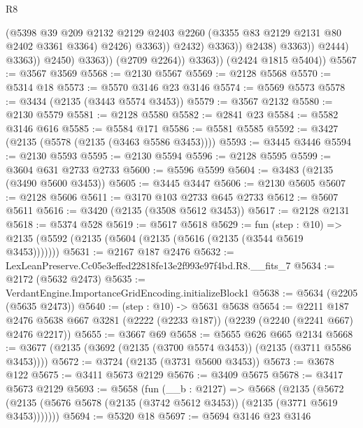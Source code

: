 \begin{lexlean}{R8}
\begin{coremodule}
                                        (@5398
                                          @39
                                          @209
                                          @2132
                                          @2129
                                          @2403
                                          @2260
                                          (@3355 @83 @2129 @2131 @80 @2402 @3361 @3364)
                                          @2426)
                                        @3363))
                                    @2432)
                                  @3363))
                              @2438)
                            @3363))
                        @2444)
                      @3363))
                  @2450)
                @3363))
            (@2709 @2264))
          @3363))
      (@2424 @1815 @5404))
@5567 := @3567 @3569
@5568 := @2130 @5567
@5569 := @2128 @5568
@5570 := @5314 @18
@5573 := @5570 @3146 @23 @3146
@5574 := @5569 @5573
@5578 := @3434 (@2135 (@3443 @5574 @3453))
@5579 := @3567 @2132
@5580 := @2130 @5579
@5581 := @2128 @5580
@5582 := @2841 @23
@5584 := @5582 @3146 @616
@5585 := @5584 @171
@5586 := @5581 @5585
@5592 := @3427 (@2135 (@5578 (@2135 (@3463 @5586 @3453))))
@5593 := @3445 @3446
@5594 := @2130 @5593
@5595 := @2130 @5594
@5596 := @2128 @5595
@5599 := @3604 @631 @2733 @2733
@5600 := @5596 @5599
@5604 := @3483 (@2135 (@3490 @5600 @3453))
@5605 := @3445 @3447
@5606 := @2130 @5605
@5607 := @2128 @5606
@5611 := @3170 @103 @2733 @645 @2733
@5612 := @5607 @5611
@5616 := @3420 (@2135 (@3508 @5612 @3453))
@5617 := @2128 @2131
@5618 := @5374 @528
@5619 := @5617 @5618
@5629 := fun (step : @10) =>
  @2135 (@5592 (@2135 (@5604 (@2135 (@5616 (@2135 (@3544 @5619 @3453)))))))
@5631 := @2167 @187 @2476
@5632 := LexLeanPreserve.Cc05e3effed22818fe13e2f993e97f4bd.R8.__fits_7
@5634 := @2172 (@5632 @2473)
@5635 := VerdantEngine.ImportanceGridEncoding.initializeBlock1
@5638 := @5634 (@2205 (@5635 @2473))
@5640 := (step : @10) -> @5631 @5638
@5654 := @2211
    @187
    @2476
    @5638
    @667
    @3281
    (@2222 (@2233 @187))
    (@2239 (@2240 (@2241 @667) @2476 @2217))
@5655 := @3667 @69
@5658 := @5655 @626 @665 @2134
@5668 := @3677 (@2135 (@3692 (@2135 (@3700 @5574 @3453)) (@2135 (@3711 @5586 @3453))))
@5672 := @3724 (@2135 (@3731 @5600 @3453))
@5673 := @3678 @122
@5675 := @3411 @5673 @2129
@5676 := @3409 @5675
@5678 := @3417 @5673 @2129
@5693 := @5658
    (fun (__b : @2127) =>
    @5668
      (@2135 (@5672 (@2135 (@5676 @5678 (@2135 (@3742 @5612 @3453)) (@2135 (@3771 @5619 @3453)))))))
@5694 := @5320 @18
@5697 := @5694 @3146 @23 @3146

\end{coremodule}
\end{lexlean}
